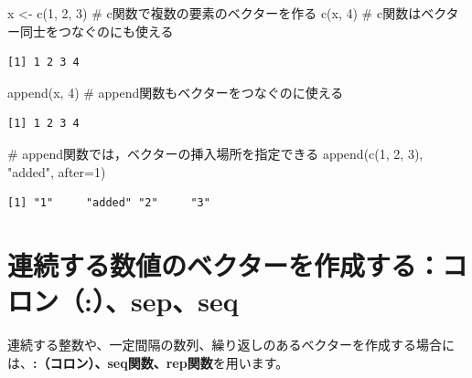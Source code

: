 \documentclass[
  letterpaper,
  DIV=11,
  numbers=noendperiod]{scrreprt}
\newenvironment{Shaded}{\begin{snugshade}}{\end{snugshade}}
\newcommand{\AttributeTok}[1]{\textcolor[rgb]{0.40,0.45,0.13}{#1}}
\newcommand{\CommentTok}[1]{\textcolor[rgb]{0.37,0.37,0.37}{#1}}
\newcommand{\DecValTok}[1]{\textcolor[rgb]{0.68,0.00,0.00}{#1}}
\newcommand{\FunctionTok}[1]{\textcolor[rgb]{0.28,0.35,0.67}{#1}}
\newcommand{\NormalTok}[1]{\textcolor[rgb]{0.00,0.23,0.31}{#1}}
\newcommand{\OtherTok}[1]{\textcolor[rgb]{0.00,0.23,0.31}{#1}}
\newcommand{\StringTok}[1]{\textcolor[rgb]{0.13,0.47,0.30}{#1}}
\begin{document}
\begin{Shaded}
\begin{Highlighting}[]
\NormalTok{x }\OtherTok{\textless{}{-}} \FunctionTok{c}\NormalTok{(}\DecValTok{1}\NormalTok{, }\DecValTok{2}\NormalTok{, }\DecValTok{3}\NormalTok{) }\CommentTok{\# c関数で複数の要素のベクターを作る}
\FunctionTok{c}\NormalTok{(x, }\DecValTok{4}\NormalTok{) }\CommentTok{\# c関数はベクター同士をつなぐのにも使える}
\end{Highlighting}
\end{Shaded}

\begin{verbatim}
[1] 1 2 3 4
\end{verbatim}

\begin{Shaded}
\begin{Highlighting}[]
\FunctionTok{append}\NormalTok{(x, }\DecValTok{4}\NormalTok{) }\CommentTok{\# append関数もベクターをつなぐのに使える}
\end{Highlighting}
\end{Shaded}

\begin{verbatim}
[1] 1 2 3 4
\end{verbatim}

\begin{Shaded}
\begin{Highlighting}[]
\CommentTok{\# append関数では，ベクターの挿入場所を指定できる}
\FunctionTok{append}\NormalTok{(}\FunctionTok{c}\NormalTok{(}\DecValTok{1}\NormalTok{, }\DecValTok{2}\NormalTok{, }\DecValTok{3}\NormalTok{), }\StringTok{"added"}\NormalTok{, }\AttributeTok{after=}\DecValTok{1}\NormalTok{) }
\end{Highlighting}
\end{Shaded}

\begin{verbatim}
[1] "1"     "added" "2"     "3"    
\end{verbatim}

\hypertarget{ux9023ux7d9aux3059ux308bux6570ux5024ux306eux30d9ux30afux30bfux30fcux3092ux4f5cux6210ux3059ux308bux30b3ux30edux30f3sepseq}{%
\section{連続する数値のベクターを作成する：コロン（:）、sep、seq}\label{ux9023ux7d9aux3059ux308bux6570ux5024ux306eux30d9ux30afux30bfux30fcux3092ux4f5cux6210ux3059ux308bux30b3ux30edux30f3sepseq}}

連続する整数や、一定間隔の数列、繰り返しのあるベクターを作成する場合には、\textbf{:（コロン）、seq関数、rep関数}を用います。
\end{document}
